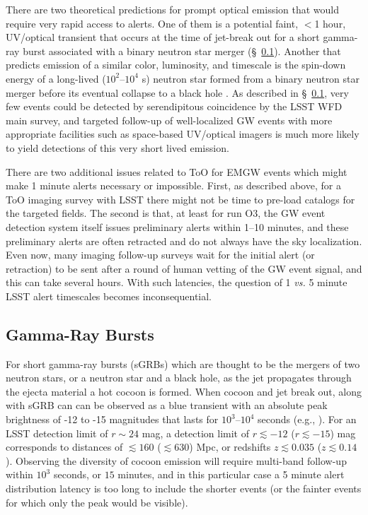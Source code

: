 \documentclass[DM,lsstdraft,authoryear,toc]{lsstdoc}
\begin{document}
There are two theoretical predictions for prompt optical emission that would require very rapid access to alerts. One of them is a potential faint, $<$1 hour, UV/optical transient that occurs at the time of jet-break out for a short gamma-ray burst associated with a binary neutron star merger (\S~\ref{ssec:latency_grb}). Another that predicts emission of a similar color, luminosity, and timescale is the spin-down energy of a long-lived ($10^2$--$10^4$ s) neutron star formed from a binary neutron star merger before its eventual collapse to a black hole \citep{2016ApJ...819...15S}. As described in \S~\ref{ssec:latency_grb}, very few events could be detected by serendipitous coincidence by the LSST WFD main survey, and targeted follow-up of well-localized GW events with more appropriate facilities such as space-based UV/optical imagers is much more likely to yield detections of this very short lived emission.

There are two additional issues related to ToO for EMGW events which might make 1 minute alerts necessary or impossible. First, as described above, for a ToO imaging survey with LSST there might not be time to pre-load catalogs for the targeted fields. The second is that, at least for run O3, the GW event detection system itself issues preliminary alerts within 1--10 minutes, and these preliminary alerts are often retracted and do not always have the sky localization. Even now, many imaging follow-up surveys wait for the initial alert (or retraction) to be sent after a round of human vetting of the GW event signal, and this can take several hours. With such latencies, the question of 1 {\it vs.} 5 minute LSST alert timescales becomes inconsequential. 



\subsection{Gamma-Ray Bursts}\label{ssec:latency_grb}

For short gamma-ray bursts (sGRBs) which are thought to be the mergers of two neutron stars, or a neutron star and a black hole, as the jet propagates through the ejecta material a hot cocoon is formed. When cocoon and jet break out, along with sGRB can can be observed as a blue transient with an absolute peak brightness of -12 to -15 magnitudes that lasts for $10^3$--$10^4$ seconds (e.g., \citealt{2018MNRAS.473..576G}). For an LSST detection limit of $r\sim24$ mag, a detection limit of $r\lesssim-12$ ($r\lesssim-15$) mag corresponds to distances of $\lesssim160$ ($\lesssim630$) Mpc, or redshifts $z\lesssim0.035$ ($z\lesssim0.14$). Observing the diversity of cocoon emission will require multi-band follow-up within $10^3$ seconds, or $15$ minutes, and in this particular case a 5 minute alert distribution latency is too long to include the shorter events (or the fainter events for which only the peak would be visible).
\end{document}
